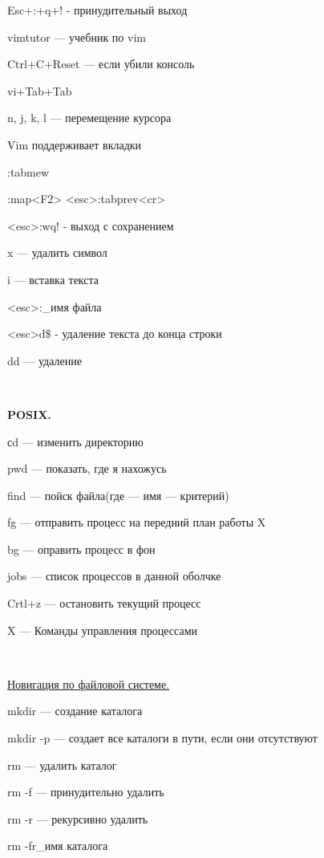 \par 
Esc+:+q+! - принудительный выход 

\par 
vimtutor — учебник по vim
\par 
Ctrl+C+Reset — если убили консоль
\par 
vi+Tab+Tab
\par 
n, j, k, l — перемещение курсора
\par 
Vim поддерживает вкладки
\par 
:tabmew
\par 
:map<F2> <esc>:tabprev<cr>
\par 
<esc>:wq! - выход с сохранением
\par 
x — удалить символ
\par 
i — вставка текста
\par 
<esc>:\_имя файла
\par 
<esc>d\$ - удаление текста до конца строки
\par 
dd — удаление
\par 
\\

\par 
\textbf{POSIX.}
\par 
сd — изменить директорию
\par 
pwd — показать, где я нахожусь
\par 
find — пойск файла(где — имя — критерий)
\par fg
— отправить процесс на передний план
работы   X
\par 
bg — оправить процесс в фон
\par 
jobs — список процессов в данной оболчке
\par 
Crtl+z — остановить текущий процесс
\par 
X — Команды управления процессами
\par 
\\

\par 
\underline{Новигация по файловой системе.}
\par 
mkdir — создание каталога
\par 
mkdir -p — создает все каталоги в пути, если
они отсутствуют
\par 
rm — удалить каталог
\par 
rm -f — принудительно удалить
\par 
rm -r — рекурсивно удалить
\par 
rm -fr\_имя каталога
\par 
\\

